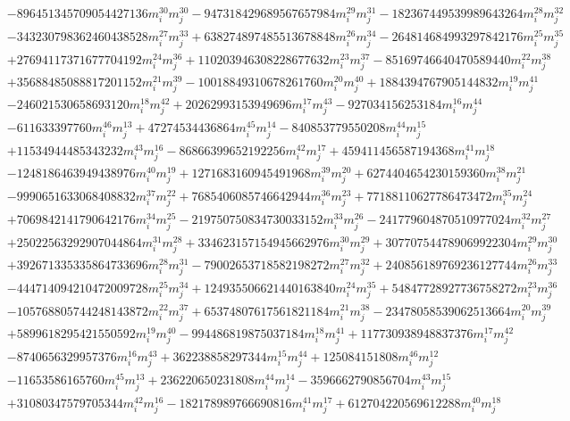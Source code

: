 {\begin{align*}
&-896451345709054427136m_i^{30}m_j^{30}-947318429689567657984m_i^{29}m_j^{31}-182367449539989643264m_i^{28}m_j^{32}\\
&-343230798362460438528m_i^{27}m_j^{33}+638274897485513678848m_i^{26}m_j^{34}-264814684993297842176m_i^{25}m_j^{35}\\
&+27694117371677704192m_i^{24}m_j^{36}+110203946308228677632m_i^{23}m_j^{37}-85169746640470589440m_i^{22}m_j^{38}\\
&+35688485088817201152m_i^{21}m_j^{39}-10018849310678261760m_i^{20}m_j^{40}+1884394767905144832m_i^{19}m_j^{41}\\
&-246021530658693120m_i^{18}m_j^{42}+20262993153949696m_i^{17}m_j^{43}-927034156253184m_i^{16}m_j^{44}\\
&-611633397760m_i^{46}m_j^{13}+47274534436864m_i^{45}m_j^{14}-840853779550208m_i^{44}m_j^{15}\\
&+11534944485343232m_i^{43}m_j^{16}-86866399652192256m_i^{42}m_j^{17}+459411456587194368m_i^{41}m_j^{18}\\
&-1248186463949438976m_i^{40}m_j^{19}+1271683160945491968m_i^{39}m_j^{20}+6274404654230159360m_i^{38}m_j^{21}\\
&-9990651633068408832m_i^{37}m_j^{22}+7685406085746642944m_i^{36}m_j^{23}+77188110627786473472m_i^{35}m_j^{24}\\
&+7069842141790642176m_i^{34}m_j^{25}-219750750834730033152m_i^{33}m_j^{26}-241779604870510977024m_i^{32}m_j^{27}\\
&+25022563292907044864m_i^{31}m_j^{28}+334623157154945662976m_i^{30}m_j^{29}+307707544789069922304m_i^{29}m_j^{30}\\
&+392671335335864733696m_i^{28}m_j^{31}-79002653718582198272m_i^{27}m_j^{32}+240856189769236127744m_i^{26}m_j^{33}\\
&-444714094210472009728m_i^{25}m_j^{34}+124935506621440163840m_i^{24}m_j^{35}+54847728927736758272m_i^{23}m_j^{36}\\
&-105768805744248143872m_i^{22}m_j^{37}+65374807617561821184m_i^{21}m_j^{38}-23478058539062513664m_i^{20}m_j^{39}\\
&+5899618295421550592m_i^{19}m_j^{40}-994486819875037184m_i^{18}m_j^{41}+117730938948837376m_i^{17}m_j^{42}\\
&-8740656329957376m_i^{16}m_j^{43}+362238858297344m_i^{15}m_j^{44}+125084151808m_i^{46}m_j^{12}\\
&-11653586165760m_i^{45}m_j^{13}+236220650231808m_i^{44}m_j^{14}-3596662790856704m_i^{43}m_j^{15}\\
&+31080347579705344m_i^{42}m_j^{16}-182178989766690816m_i^{41}m_j^{17}+612704220569612288m_i^{40}m_j^{18}\\

\end{align*}}
